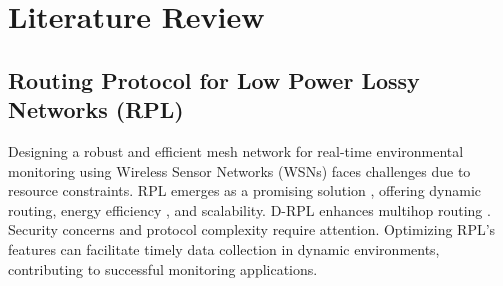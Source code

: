 
\section*{Literature Review}\label{sec:lr}

\subsection{Routing Protocol for Low Power Lossy Networks (RPL)}\label{sec:lr_rpl}

Designing a robust and efficient mesh network for real-time environmental monitoring using Wireless Sensor Networks (WSNs) faces challenges due to resource constraints. RPL emerges as a promising solution \cite{rechache_study_2021, alexander_rpl_2012, Kharrufa2019RPL-Based}, offering dynamic routing, energy efficiency \cite{info8040124}, and scalability. D-RPL enhances multihop routing \cite{kharrufa_dynamic_2017}. Security concerns \cite{arena_evaluating_2020, mayzaud_distributed_2017, 8998289} and protocol complexity \cite{kharrufa_dynamic_2017} require attention. Optimizing RPL's features can facilitate timely data collection in dynamic environments, contributing to successful monitoring applications.





